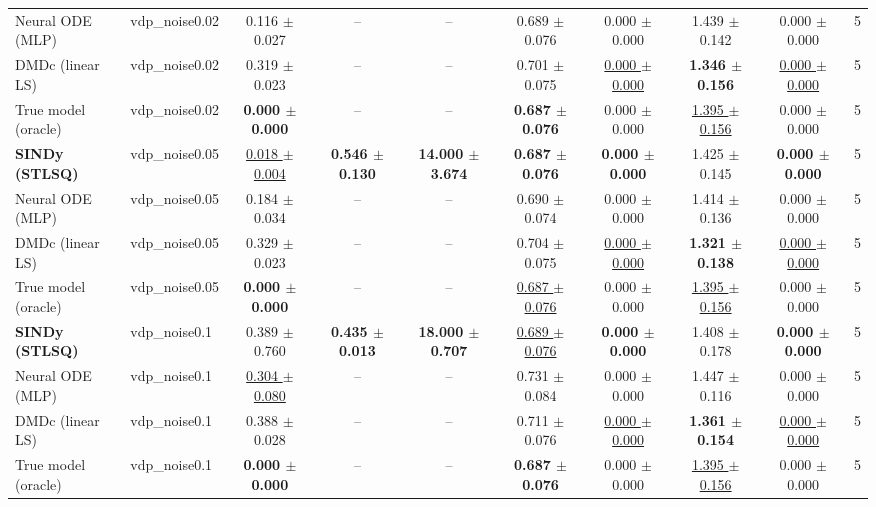 \begin{tabular}{llcccccccc}
Neural ODE (MLP) & vdp\_noise0.02 & 0.116 $\pm$ 0.027 & -- & -- & 0.689 $\pm$ 0.076 & 0.000 $\pm$ 0.000 & 1.439 $\pm$ 0.142 & 0.000 $\pm$ 0.000 & 5 \\
DMDc (linear LS) & vdp\_noise0.02 & 0.319 $\pm$ 0.023 & -- & -- & 0.701 $\pm$ 0.075 & \underline{0.000 $\pm$ 0.000} & \textbf{1.346 $\pm$ 0.156} & \underline{0.000 $\pm$ 0.000} & 5 \\
True model (oracle) & vdp\_noise0.02 & \textbf{0.000 $\pm$ 0.000} & -- & -- & \textbf{0.687 $\pm$ 0.076} & 0.000 $\pm$ 0.000 & \underline{1.395 $\pm$ 0.156} & 0.000 $\pm$ 0.000 & 5 \\
\midrule
\textbf{SINDy (STLSQ)} & vdp\_noise0.05 & \underline{0.018 $\pm$ 0.004} & \textbf{0.546 $\pm$ 0.130} & \textbf{14.000 $\pm$ 3.674} & \textbf{0.687 $\pm$ 0.076} & \textbf{0.000 $\pm$ 0.000} & 1.425 $\pm$ 0.145 & \textbf{0.000 $\pm$ 0.000} & 5 \\
Neural ODE (MLP) & vdp\_noise0.05 & 0.184 $\pm$ 0.034 & -- & -- & 0.690 $\pm$ 0.074 & 0.000 $\pm$ 0.000 & 1.414 $\pm$ 0.136 & 0.000 $\pm$ 0.000 & 5 \\
DMDc (linear LS) & vdp\_noise0.05 & 0.329 $\pm$ 0.023 & -- & -- & 0.704 $\pm$ 0.075 & \underline{0.000 $\pm$ 0.000} & \textbf{1.321 $\pm$ 0.138} & \underline{0.000 $\pm$ 0.000} & 5 \\
True model (oracle) & vdp\_noise0.05 & \textbf{0.000 $\pm$ 0.000} & -- & -- & \underline{0.687 $\pm$ 0.076} & 0.000 $\pm$ 0.000 & \underline{1.395 $\pm$ 0.156} & 0.000 $\pm$ 0.000 & 5 \\
\midrule
\textbf{SINDy (STLSQ)} & vdp\_noise0.1 & 0.389 $\pm$ 0.760 & \textbf{0.435 $\pm$ 0.013} & \textbf{18.000 $\pm$ 0.707} & \underline{0.689 $\pm$ 0.076} & \textbf{0.000 $\pm$ 0.000} & 1.408 $\pm$ 0.178 & \textbf{0.000 $\pm$ 0.000} & 5 \\
Neural ODE (MLP) & vdp\_noise0.1 & \underline{0.304 $\pm$ 0.080} & -- & -- & 0.731 $\pm$ 0.084 & 0.000 $\pm$ 0.000 & 1.447 $\pm$ 0.116 & 0.000 $\pm$ 0.000 & 5 \\
DMDc (linear LS) & vdp\_noise0.1 & 0.388 $\pm$ 0.028 & -- & -- & 0.711 $\pm$ 0.076 & \underline{0.000 $\pm$ 0.000} & \textbf{1.361 $\pm$ 0.154} & \underline{0.000 $\pm$ 0.000} & 5 \\
True model (oracle) & vdp\_noise0.1 & \textbf{0.000 $\pm$ 0.000} & -- & -- & \textbf{0.687 $\pm$ 0.076} & 0.000 $\pm$ 0.000 & \underline{1.395 $\pm$ 0.156} & 0.000 $\pm$ 0.000 & 5 \\
\bottomrule
\end{tabular}
